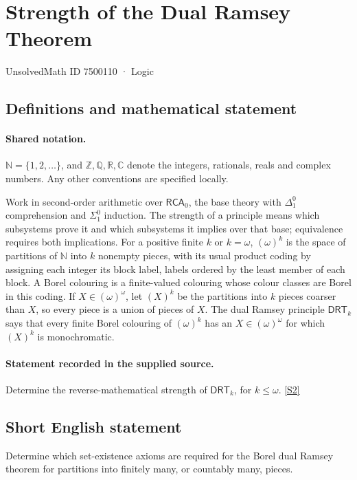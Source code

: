 \documentclass[11pt]{article}
\newcommand{\sref}[2]{\hyperlink{source:#1:#2}{[S#2]}}
\begin{document}
\setcounter{section}{7500109}
\section{Strength of the Dual Ramsey Theorem}\label{7500110}
{\small\sffamily UnsolvedMath ID 7500110 · Logic}
\subsection{Definitions and mathematical statement}

\paragraph{Shared notation.}$\mathbb N=\{1,2,\ldots\}$, and $\mathbb Z,\mathbb Q,\mathbb R,\mathbb C$ denote the integers, rationals, reals and complex numbers. Any other conventions are specified locally.


Work in second-order arithmetic over $\mathsf{RCA}_0$, the base theory with $\Delta^0_1$ comprehension and $\Sigma^0_1$ induction. The strength of a principle means which subsystems prove it and which subsystems it implies over that base; equivalence requires both implications. For a positive finite $k$ or $k=\omega$, $(\omega)^k$ is the space of partitions of $\mathbb N$ into $k$ nonempty pieces, with its usual product coding by assigning each integer its block label, labels ordered by the least member of each block. A Borel colouring is a finite-valued colouring whose colour classes are Borel in this coding. If $X\in(\omega)^\omega$, let $(X)^k$ be the partitions into $k$ pieces coarser than $X$, so every piece is a union of pieces of $X$. The dual Ramsey principle $\mathsf{DRT}_k$ says that every finite Borel colouring of $(\omega)^k$ has an $X\in(\omega)^\omega$ for which $(X)^k$ is monochromatic.
\paragraph{Statement recorded in the supplied source.}
Determine the reverse-mathematical strength of $\mathsf{DRT}_k$, for $k\leq\omega$. \sref{7500110}{2}
\subsection{Short English statement}
Determine which set-existence axioms are required for the Borel dual Ramsey theorem for partitions into finitely many, or countably many, pieces.
\end{document}

